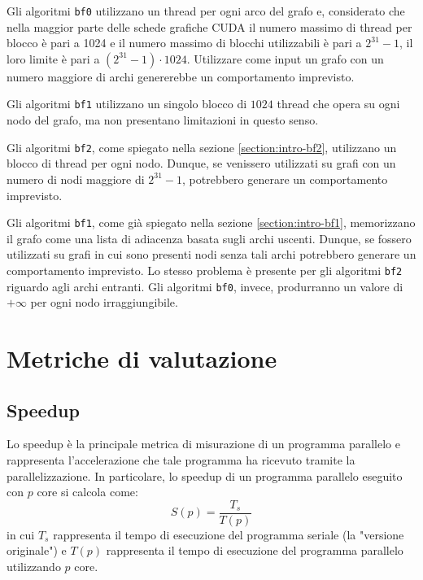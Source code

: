 \documentclass[12pt,a4paper,oneside]{book}
\begin{document}
	Gli algoritmi \texttt{bf0} utilizzano un thread per ogni arco del grafo e, considerato che nella maggior parte delle schede grafiche CUDA il numero massimo di thread per blocco è pari a 1024 e il numero massimo di blocchi utilizzabili è pari a $2^{31}-1$\cite{cudaSpecifications}, il loro limite è pari a $(2^{31}-1)\cdot 1024$. Utilizzare come input un grafo con un numero maggiore di archi genererebbe un comportamento imprevisto.
	
	Gli algoritmi \texttt{bf1} utilizzano un singolo blocco di $1024$ thread che opera su ogni nodo del grafo, ma non presentano limitazioni in questo senso.
	
	Gli algoritmi \texttt{bf2}, come spiegato nella sezione \ref{section:intro-bf2}, utilizzano un blocco di thread per ogni nodo. Dunque, se venissero utilizzati su grafi con un numero di nodi maggiore di $2^{31}-1$, potrebbero generare un comportamento imprevisto.
	
	Gli algoritmi \texttt{bf1}, come già spiegato nella sezione \ref{section:intro-bf1}, memorizzano il grafo come una lista di adiacenza basata sugli archi uscenti. Dunque, se fossero utilizzati su grafi in cui sono presenti nodi senza tali archi potrebbero generare un comportamento imprevisto. Lo stesso problema è presente per gli algoritmi \texttt{bf2} riguardo agli archi entranti. Gli algoritmi \texttt{bf0}, invece, produrranno un valore di $+\infty$ per ogni nodo irraggiungibile.
	
	\chapter{Metriche di valutazione}
	\label{chap:metriche}
	\section{Speedup}
	Lo speedup è la principale metrica di misurazione di un programma parallelo e rappresenta l'accelerazione che tale programma ha ricevuto tramite la parallelizzazione. In particolare, lo speedup di un programma parallelo eseguito con $p$ core si calcola come:
	\begin{equation}
		S(p) = \frac{T_s}{T(p)}
		\label{eq:speedup}
	\end{equation}
	in cui $T_s$ rappresenta il tempo di esecuzione del programma seriale (la "versione originale") e $T(p)$ rappresenta il tempo di esecuzione del programma parallelo utilizzando $p$ core.
	
\end{document}
